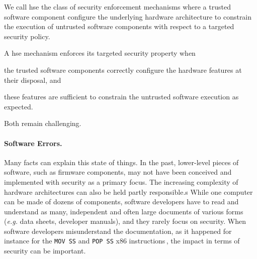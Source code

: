 \begin{definition}
  We call \ac{hse} the class of security enforcement mechanisms where a trusted
  software component configure the underlying hardware architecture to constrain
  the execution of untrusted software components with respect to a targeted
  security policy.
\end{definition}

A \ac{hse} mechanism enforces its targeted security property when
%
\begin{inparaenum}[(1)]
\item the trusted software components correctly configure the hardware features
  at their disposal, and
%
\item these features are sufficient to constrain the untrusted software
  execution as expected.
\end{inparaenum}
%
Both remain challenging.

\paragraph{Software Errors.}
%
Many facts can explain this state of things.
%
In the past, lower-level pieces of software, such as firmware components, may
not have been conceived and implemented with security as a primary focus.
%
The increasing complexity of hardware architectures can also be held partly
responsible.s
%
While one computer can be made of dozens of components, software developers have
to read and understand as many, independent and often large documents of various
forms (\emph{e.g.} data sheets, developer manuals), and they rarely focus on
security.
%
When software developers misunderstand the documentation, as it happened for
instance for the \texttt{MOV SS} and \texttt{POP SS} x86
instructions\,\cite{movsspopss}, the impact in terms of security can be
important.

